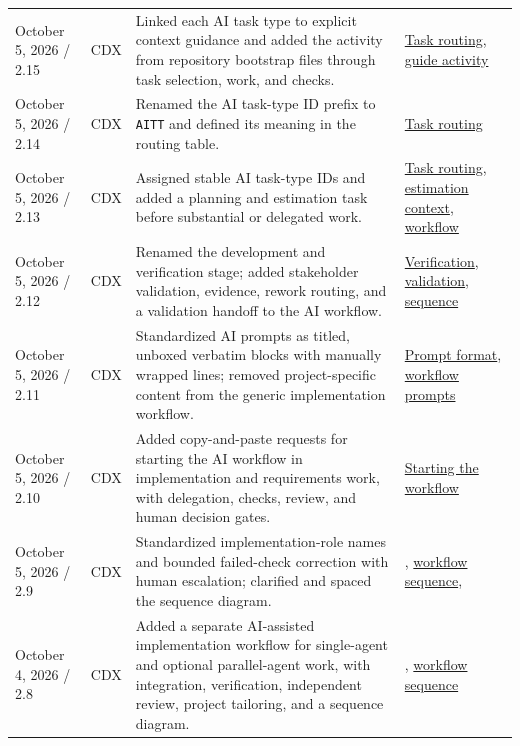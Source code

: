 \begin{tabularx}{\linewidth}{L{3.1cm}L{2.2cm}YL{2.0cm}}
October 5, 2026 / 2.15 & CDX & Linked each AI task type to explicit context guidance and added the activity from repository bootstrap files through task selection, work, and checks. & \hyperref[Table:AISkills]{Task routing}, \hyperref[Figure:AIGuideActivity]{guide activity}\\
October 5, 2026 / 2.14 & CDX & Renamed the AI task-type ID prefix to \texttt{AITT} and defined its meaning in the routing table. & \hyperref[Table:AISkills]{Task routing}\\
October 5, 2026 / 2.13 & CDX & Assigned stable AI task-type IDs and added a planning and estimation task before substantial or delegated work. & \hyperref[Table:AISkills]{Task routing}, \hyperref[Section:AIPlanningEstimateContext]{estimation context}, \hyperref[Chapter:AIImplementationWorkflow]{workflow}\\
October 5, 2026 / 2.12 & CDX & Renamed the development and verification stage; added stakeholder validation, evidence, rework routing, and a validation handoff to the AI workflow. & \hyperref[Section:AIImplementationVerification]{Verification}, \hyperref[Section:AIImplementationValidation]{validation}, \hyperref[Figure:AIImplementationSequence]{sequence}\\
October 5, 2026 / 2.11 & CDX & Standardized AI prompts as titled, unboxed verbatim blocks with manually wrapped lines; removed project-specific content from the generic implementation workflow. & \hyperref[Section:AIPromptFormatting]{Prompt format}, \hyperref[Section:AIImplementationStart]{workflow prompts}\\
October 5, 2026 / 2.10 & CDX & Added copy-and-paste requests for starting the AI workflow in implementation and requirements work, with delegation, checks, review, and human decision gates. & \hyperref[Section:AIImplementationStart]{Starting the workflow}\\
October 5, 2026 / 2.9 & CDX & Standardized implementation-role names and bounded failed-check correction with human escalation; clarified and spaced the sequence diagram. & , \hyperref[Figure:AIImplementationSequence]{workflow sequence}, \\
October 4, 2026 / 2.8 & CDX & Added a separate AI-assisted implementation workflow for single-agent and optional parallel-agent work, with integration, verification, independent review, project tailoring, and a sequence diagram. & , \hyperref[Figure:AIImplementationSequence]{workflow sequence}\\

\end{tabularx}

